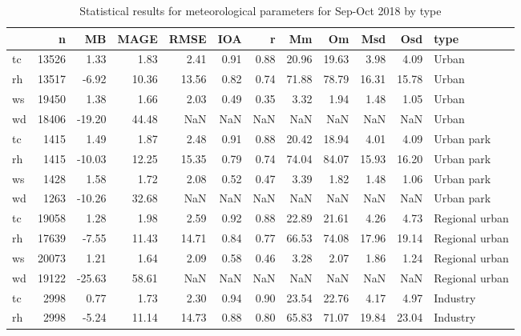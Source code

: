 \begin{table}
\centering
\caption{Statistical results for meteorological parameters for Sep-Oct 2018 by type}
\label{tab:stats_all_type}
\begin{tabular}{lrrrrrrrrrrl}
\toprule
{} &      n &     MB &   MAGE &   RMSE &   IOA &     r &     Mm &     Om &    Msd &    Osd &                 type \\
\midrule
tc &  13526 &   1.33 &   1.83 &   2.41 &  0.91 &  0.88 &  20.96 &  19.63 &   3.98 &   4.09 &                Urban \\
rh &  13517 &  -6.92 &  10.36 &  13.56 &  0.82 &  0.74 &  71.88 &  78.79 &  16.31 &  15.78 &                Urban \\
ws &  19450 &   1.38 &   1.66 &   2.03 &  0.49 &  0.35 &   3.32 &   1.94 &   1.48 &   1.05 &                Urban \\
wd &  18406 & -19.20 &  44.48 &    NaN &   NaN &   NaN &    NaN &    NaN &    NaN &    NaN &                Urban \\
tc &   1415 &   1.49 &   1.87 &   2.48 &  0.91 &  0.88 &  20.42 &  18.94 &   4.01 &   4.09 &           Urban park \\
rh &   1415 & -10.03 &  12.25 &  15.35 &  0.79 &  0.74 &  74.04 &  84.07 &  15.93 &  16.20 &           Urban park \\
ws &   1428 &   1.58 &   1.72 &   2.08 &  0.52 &  0.47 &   3.39 &   1.82 &   1.48 &   1.06 &           Urban park \\
wd &   1263 & -10.26 &  32.68 &    NaN &   NaN &   NaN &    NaN &    NaN &    NaN &    NaN &           Urban park \\
tc &  19058 &   1.28 &   1.98 &   2.59 &  0.92 &  0.88 &  22.89 &  21.61 &   4.26 &   4.73 &       Regional urban \\
rh &  17639 &  -7.55 &  11.43 &  14.71 &  0.84 &  0.77 &  66.53 &  74.08 &  17.96 &  19.14 &       Regional urban \\
ws &  20073 &   1.21 &   1.64 &   2.09 &  0.58 &  0.46 &   3.28 &   2.07 &   1.86 &   1.24 &       Regional urban \\
wd &  19122 & -25.63 &  58.61 &    NaN &   NaN &   NaN &    NaN &    NaN &    NaN &    NaN &       Regional urban \\
tc &   2998 &   0.77 &   1.73 &   2.30 &  0.94 &  0.90 &  23.54 &  22.76 &   4.17 &   4.97 &             Industry \\
rh &   2998 &  -5.24 &  11.14 &  14.73 &  0.88 &  0.80 &  65.83 &  71.07 &  19.84 &  23.04 &             Industry \\

\end{tabular}
\end{table}
